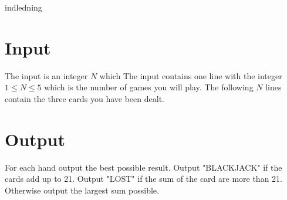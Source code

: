 indledning

\section*{Input}

The input is an integer $N$ which 
The input contains one line with the integer $1 \leq N \leq 5$ which is the number of games you will play.
The following $N$ lines contain the three cards you have been dealt.

\section*{Output}

For each hand output the best possible result.
Output "BLACKJACK" if the cards add up to 21.
Output "LOST" if the sum of the card are more than 21.
Otherwise output the largest sum possible.

